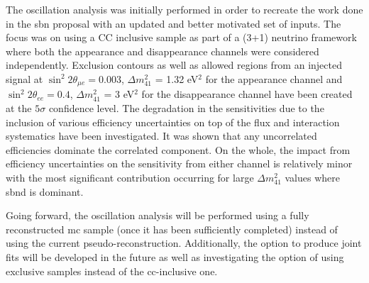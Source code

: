 The oscillation analysis was initially performed in order to recreate the work done in the \gls{sbn} proposal with an updated and better motivated set of inputs. The focus was on using a \nue CC inclusive sample as part of a (3+1) neutrino framework where both the \nue appearance and disappearance channels were considered independently. Exclusion contours as well as allowed regions from an injected signal at $\sin^2{2\theta_{\mu e}} = 0.003$, $\Delta m^2_{41}$ = 1.32 eV$^2$ for the appearance channel and $\sin^2{2\theta_{ee}} = 0.4$, $\Delta m^2_{41}$ = 3 eV$^2$ for the disappearance channel have been created at the $5\sigma$ confidence level. The degradation in the sensitivities due to the inclusion of various efficiency uncertainties on top of the flux and interaction systematics have been investigated. It was shown that any uncorrelated efficiencies dominate the correlated component. On the whole, the impact from efficiency uncertainties on the sensitivity from either \nue channel is relatively minor with the most significant contribution occurring for large $\Delta m^2_{41}$ values where \gls{sbnd} is dominant. 

Going forward, the oscillation analysis will be performed using a fully reconstructed \gls{mc} sample (once it has been sufficiently completed) instead of using the current pseudo-reconstruction. Additionally, the option to produce joint fits will be developed in the future as well as investigating the option of using exclusive samples instead of the \gls{cc}-inclusive one.


